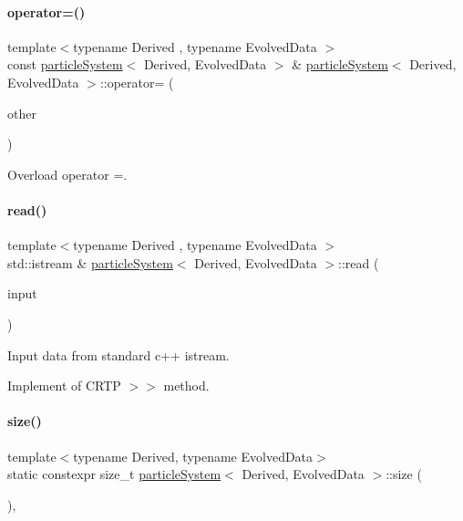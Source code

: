 \paragraph{\texorpdfstring{operator=()}{operator=()}}
{\footnotesize\ttfamily template$<$typename Derived , typename Evolved\+Data $>$ \\
const \mbox{\hyperlink{classparticle_system}{particle\+System}}$<$ Derived, Evolved\+Data $>$ \& \mbox{\hyperlink{classparticle_system}{particle\+System}}$<$ Derived, Evolved\+Data $>$\+::operator= (\begin{DoxyParamCaption}\item[{const \mbox{\hyperlink{classparticle_system}{particle\+System}}$<$ Derived, Evolved\+Data $>$ \&}]{other }\end{DoxyParamCaption})}



Overload operator =. 

\mbox{\label{classparticle_system_ade26a52e1b5eae4ba5e37a3e4a3b9cd4}} 
\paragraph{\texorpdfstring{read()}{read()}}
{\footnotesize\ttfamily template$<$typename Derived , typename Evolved\+Data $>$ \\
std\+::istream \& \mbox{\hyperlink{classparticle_system}{particle\+System}}$<$ Derived, Evolved\+Data $>$\+::read (\begin{DoxyParamCaption}\item[{std\+::istream \&}]{input }\end{DoxyParamCaption})}



Input data from standard c++ istream. 

Implement of C\+R\+TP \textquotesingle{}$>$$>$\textquotesingle{} method. \mbox{\label{classparticle_system_add9db06ecfc4ba31291641c5b2157764}} 
\paragraph{\texorpdfstring{size()}{size()}}
{\footnotesize\ttfamily template$<$typename Derived, typename Evolved\+Data$>$ \\
static constexpr size\+\_\+t \mbox{\hyperlink{classparticle_system}{particle\+System}}$<$ Derived, Evolved\+Data $>$\+::size (\begin{DoxyParamCaption}{ }\end{DoxyParamCaption})\hspace{0.3cm}{\ttfamily [inline]}, {\ttfamily [static]}}



